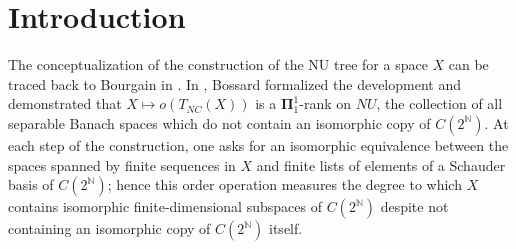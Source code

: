 \documentclass{article}
\newenvironment{AMS}{}{}
\newenvironment{keywords}{}{}
\newcommand{\N}{\mathbb N}
\begin{document}
\newpage
\maketitle
\begin{abstract}
In \cite{Bo}, Bossard introduced the notion of the non-universal tree $T_{NU}(X)$ associated with each separable Banach space $X$ which does not contain an isomorphic copy of $C(2^\N)$. Together with the order operation defined on well-founded trees, we obtain a method of classifying the complexity of separable Banach spaces by the degree of isomorphism of finite-dimensional subspaces of $C(2^\N)$. Despite further refinement of this concept in later years, we are unaware of any specific instances of direct computations of the order of the non-universal tree for a concrete space and basis. We show that if $H$ is any separable Hilbert space, then $o(T_{NU}(H)) = \omega + 1$ when taken with respect to the Haar basis for $C(2^\N)$, demonstrating that the class of Hilbert spaces is the least complex class with respect to this measurement when considering this basis.
\end{abstract}



\section{Introduction}
The conceptualization of the construction of the NU tree for a space $X$ can be traced back to Bourgain in \cite{Bu}. In \cite{Bo}, Bossard formalized the development and demonstrated that $X\mapsto o(T_{NC}(X))$ is a $\boldsymbol{\Pi}_1^1$-rank on $NU$, the collection of all separable Banach spaces which do not contain an isomorphic copy of $C(2^\N)$. At each step of the construction, one asks for an isomorphic equivalence between the spaces spanned by finite sequences in $X$ and finite lists of elements of a Schauder basis of $C(2^\N)$; hence this order operation measures the degree to which $X$ contains isomorphic finite-dimensional subspaces of $C(2^\N)$ despite not containing an isomorphic copy of $C(2^\N)$ itself.
\end{document}
